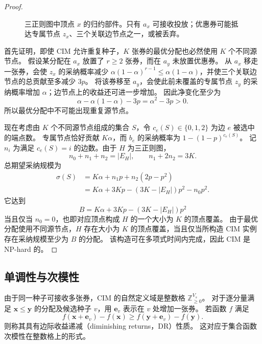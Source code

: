 \documentclass[sigconf,balance=false]{acmart}
\begin{document}
\begin{proof}
\begin{figure}[t]
  \caption{三正则图中顶点 $x$ 的归约部件。只有 $a_x$ 可接收投放；优惠券可能抵达专属节点 $z_x$、三个关联边节点之一，或被丢弃。}
  \label{fig:hardness-gadget}
\end{figure}

首先证明，即使 CIM 允许重复种子，$K$ 张券的最优分配也必然使用 $K$ 个不同源节点。
假设某分配在 $a_x$ 放置了 $r\geq2$ 张券，而在 $a_y$ 未放置优惠券。
从 $a_x$ 移走一张券，会使 $z_x$ 的采纳概率减少 $\alpha(1-\alpha)^{r-1}\leq\alpha(1-\alpha)$，并使三个关联边节点的总贡献至多减少 $3p$。
将该券移至 $a_y$，会使此前未覆盖的专属节点 $z_y$ 的采纳概率增加 $\alpha$；边节点上的收益还可进一步增加。
因此净变化至少为
\[
  \alpha-\alpha(1-\alpha)-3p=\alpha^2-3p>0.
\]
所以最优分配中不可能出现重复源节点。

现在考虑由 $K$ 个不同源节点组成的集合 $S$，令 $c_e(S)\in\{0,1,2\}$ 为边 $e$ 被选中的端点数。
专属节点恰好贡献 $K\alpha$，而 $b_e$ 的采纳概率为 $1-(1-p)^{c_e(S)}$。
记 $n_i$ 为满足 $c_e(S)=i$ 的边数。由于 $H$ 为三正则图，
\[
  n_0+n_1+n_2=|E_H|,
  \qquad n_1+2n_2=3K.
\]
总期望采纳规模为
\begin{align*}
  \sigma(S)
  &=K\alpha+n_1p+n_2(2p-p^2)\\
  &=K\alpha+3Kp-(3K-|E_H|)p^2-n_0p^2.
\end{align*}
它达到
\[
  B=K\alpha+3Kp-(3K-|E_H|)p^2
\]
当且仅当 $n_0=0$，也即对应顶点构成 $H$ 的一个大小为 $K$ 的顶点覆盖。
由于最优分配使用不同源节点，$H$ 存在大小为 $K$ 的顶点覆盖，当且仅当所构造 CIM 实例存在采纳规模至少为 $B$ 的分配。
该构造可在多项式时间内完成，因此 CIM 是 NP-hard 的。
\end{proof}

\subsection{单调性与次模性}

由于同一种子可接收多张券，CIM 的自然定义域是整数格 $\mathbb{Z}_{\geq0}^{V_s}$。
对于逐分量满足 $\bm{x}\leq\bm{y}$ 的分配及候选种子 $v$，用 $\bm{e}_v$ 表示在 $v$ 处增加一张券。
若函数 $f$ 满足
\[
  f(\bm{x}+\bm{e}_v)-f(\bm{x})
  \geq
  f(\bm{y}+\bm{e}_v)-f(\bm{y}).
\]
则称其具有边际收益递减（diminishing returns，DR）性质。
这对应于集合函数次模性在整数格上的形式。
\end{document}
